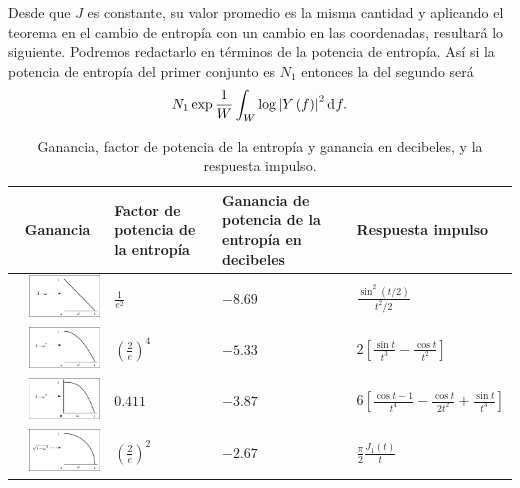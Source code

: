 Desde que $J$ es constante, su valor promedio es la misma cantidad y
aplicando el teorema en el cambio de entrop\'ia con un cambio en las
coordenadas, resultar\'a lo siguiente. Podremos redactarlo en
t\'erminos de la potencia de entrop\'ia. As\'i si la potencia de
entrop\'ia del primer conjunto es $N_{1}$ entonces la del segundo
ser\'a
\begin{equation}
N_{1}\exp \frac{1}{W}\int_{W}^{\:}\log \left | Y\left ( f \right )
\right |^{2} \diff f.
\end{equation}

\begin{table}[!ht]
\caption{Ganancia, factor de potencia de la entrop\'ia y ganancia en decibeles, y la respuesta impulso.}
\label{table1}
\begin{center}
\begin{tabular}{|m{1mm}m{40mm}|m{20mm}|m{15mm}|m{35mm}|}
\hline
\multicolumn{2}{|c|}{\sc Ganancia} & {\sc Factor de potencia de la entrop\'ia} & {\sc Ganancia de potencia de la entrop\'ia en decibeles} & {\sc Respuesta impulso} \\
\hline
& \includegraphics[width=40mm]{./Imagenes/Table11.png} & $\frac{1}{e^2}$ & $-8.69$ & $\frac{\sin^2(t/2)}{t^2 / 2}$ \\
\hline
& \includegraphics[width=40mm]{./Imagenes/Table12.png} & $\left (\frac{2}{e}  \right )^{4}$ & $-5.33$ & $2\left [ \frac{\sin t}{t^3} - \frac{\cos t}{t^2} \right ]$ \\
\hline
& \includegraphics[width=40mm]{./Imagenes/Table13.png} & $0.411$ & $-3.87$ & $6\left [ \frac{\cos t - 1}{t^4} - \frac{\cos t}{2t^2} + \frac{\sin t}{t^3} \right ]$ \\
\hline
& \includegraphics[width=40mm]{./Imagenes/Table14.png} & $\left (\frac{2}{e}  \right )^{2}$ & $-2.67$ & $\frac{\pi }{2} \frac{J_{1}\left ( t \right )}{t}$ \\

\end{tabular}
\end{center}
\end{table}
